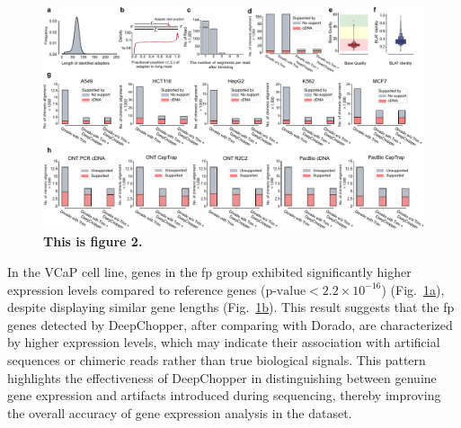 \documentclass[pdflatex, sn-mathphys-num, lineno]{sn-jnl}%
\newcommand{\figref}[2]{Fig.~\hyperref[#1]{\ref*{#1}#2}}
\theoremstyle{thmstyleone}%
\theoremstyle{thmstyletwo}%
\theoremstyle{thmstylethree}%
\begin{document}
\begin{figure}[!h]
    \includegraphics[height=1.2\columnwidth]{figures/finals/figure2}
    \caption{\bf This is figure 2.}\label{fig:f2}
\end{figure}


In the VCaP cell line, genes in the \gls{fp} group exhibited significantly higher expression levels compared to reference genes (\(\textrm{p-value} < 2.2 \times 10^{-16}\)) (\figref{fig:f2}{a}), despite displaying similar gene lengths (\figref{fig:f2}{b}).
This result suggests that the \gls{fp} genes detected by DeepChopper, after comparing with Dorado, are characterized by higher expression levels, which may indicate their association with artificial sequences or chimeric reads rather than true biological signals.
This pattern highlights the effectiveness of DeepChopper in distinguishing between genuine gene expression and artifacts introduced during sequencing, thereby improving the overall accuracy of gene expression analysis in the dataset.
\end{document}
